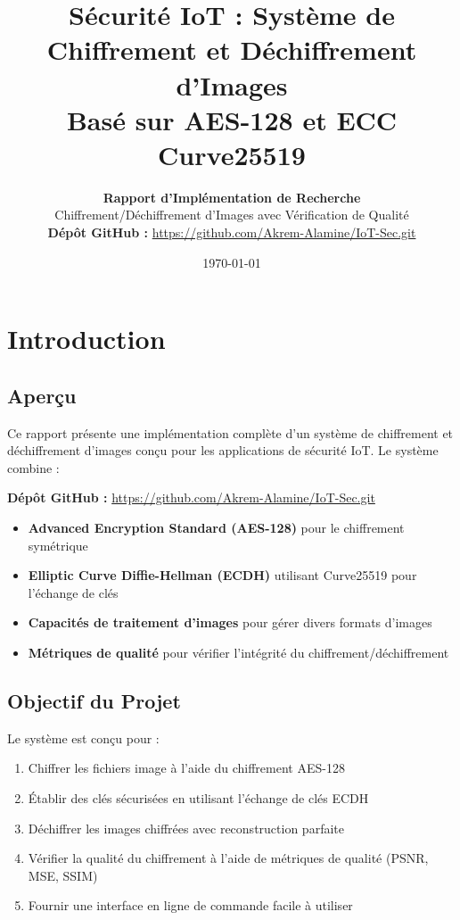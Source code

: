\documentclass[12pt,a4paper]{report}
\title{
    \textbf{Sécurité IoT : Système de Chiffrement et Déchiffrement d'Images}\\
    \large{Basé sur AES-128 et ECC Curve25519}
}
\author{
    \textbf{Rapport d'Implémentation de Recherche}\\
    Chiffrement/Déchiffrement d'Images avec Vérification de Qualité\\
    \vspace{0.5cm}
    \textbf{Dépôt GitHub :} \url{https://github.com/Akrem-Alamine/IoT-Sec.git}
}
\date{\today}
\begin{document}
\maketitle

\tableofcontents
\newpage

\chapter{Introduction}

\section{Aperçu}

Ce rapport présente une implémentation complète d'un système de chiffrement et déchiffrement d'images conçu pour les applications de sécurité IoT. Le système combine :

\textbf{Dépôt GitHub :} \url{https://github.com/Akrem-Alamine/IoT-Sec.git}

\begin{itemize}
    \item \textbf{Advanced Encryption Standard (AES-128)} pour le chiffrement symétrique
    \item \textbf{Elliptic Curve Diffie-Hellman (ECDH)} utilisant Curve25519 pour l'échange de clés
    \item \textbf{Capacités de traitement d'images} pour gérer divers formats d'images
    \item \textbf{Métriques de qualité} pour vérifier l'intégrité du chiffrement/déchiffrement
\end{itemize}

\section{Objectif du Projet}

Le système est conçu pour :
\begin{enumerate}
    \item Chiffrer les fichiers image à l'aide du chiffrement AES-128
    \item Établir des clés sécurisées en utilisant l'échange de clés ECDH
    \item Déchiffrer les images chiffrées avec reconstruction parfaite
    \item Vérifier la qualité du chiffrement à l'aide de métriques de qualité (PSNR, MSE, SSIM)
    \item Fournir une interface en ligne de commande facile à utiliser
\end{enumerate}
\end{document}
